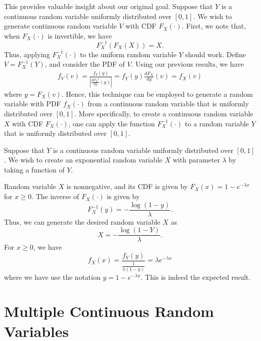 This provides valuable insight about our original goal.
Suppose that $Y$ is a continuous random variable uniformly distributed over $[0,1]$.
We wish to generate continuous random variable $V$ with CDF $F_X(\cdot)$.
First, we note that, when $F_X (\cdot)$ is invertible, we have
\begin{equation*}
F_X^{-1} \left( F_X (X) \right) = X .
\end{equation*}
Thus, applying $F_X^{-1} (\cdot)$ to the uniform random variable $Y$ should work.
Define $V = F_X^{-1} (Y)$, and consider the PDF of $V$.
Using our previous results, we have
\begin{equation*}
\begin{split}
f_V (v) = \frac{ f_Y (y) }{ \left| \frac{d F_X^{-1}}{dy} (y) \right| }
= f_Y (y) \frac{d F_X}{dy} (v) = f_X (v)
\end{split}
\end{equation*}
where $y = F_X (v)$.
Hence, this technique can be employed to generate a random variable with PDF $f_X (\cdot)$ from a continuous random variable that is uniformly distributed over $[0,1]$.
More specifically, to create a continuous random variable $X$ with CDF $F_X (\cdot)$, one can apply the function $F_X^{-1} (\cdot)$ to a random variable $Y$ that is uniformly distributed over $[0,1]$.

\begin{example}
Suppose that $Y$ is a continuous random variable uniformly distributed over $[0,1]$.
We wish to create an exponential random variable $X$ with parameter $\lambda$ by taking a function of $Y$.

Random variable $X$ is nonnegative, and its CDF is given by $F_X(x) = 1 - e^{- \lambda x}$ for $x \geq 0$.
The inverse of $F_X (\cdot)$ is given by
\begin{equation*}
F_X^{-1} (y) = - \frac{ \log (1 - y) }{\lambda} .
\end{equation*}
Thus, we can generate the desired random variable $X$ as
\begin{equation*}
X = - \frac{ \log (1 - Y) }{\lambda} .
\end{equation*}
For $x \geq 0$, we have
\begin{equation*}
f_X (x) = \frac{ f_Y (y) }{ \frac{1}{\lambda (1 - y)} }
= \lambda e^{- \lambda x}
\end{equation*}
where we have use the notation $y = 1 - e^{- \lambda x}$.
This is indeed the expected result.
\end{example}


\section{Multiple Continuous Random Variables}

